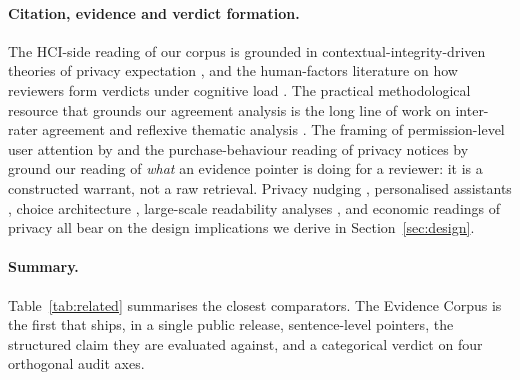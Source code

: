 \documentclass[11pt,a4paper]{article}
\begin{document}
\paragraph{Citation, evidence and verdict formation.}
The HCI-side reading of our corpus is grounded in
contextual-integrity-driven theories of privacy expectation
\citep{nissenbaum2004privacy,rao2016expecting}, and the human-factors
literature on how reviewers form verdicts under cognitive load
\citep{hart2008measurement,acquisti2015privacy}. The practical
methodological resource that grounds our agreement analysis is
the long line of work on inter-rater agreement
\citep{cohen1960coefficient,landis1977measurement} and reflexive
thematic analysis \citep{braun2006using}. The framing of
permission-level user attention by \citet{felt2012android} and the
purchase-behaviour reading of privacy notices by
\citet{tsai2011effect,jensen2004privacy} ground our reading of
\emph{what} an evidence pointer is doing for a reviewer: it is a
constructed warrant, not a raw retrieval. Privacy nudging
\citep{almuhimedi2015your}, personalised assistants
\citep{liu2016follow,lin2014modeling}, choice architecture
\citep{egelman2013choice}, large-scale readability analyses
\citep{fabian2017large,mcdonald2008cost}, and economic readings of
privacy \citep{acquisti2015privacy} all bear on the design
implications we derive in Section~\ref{sec:design}.

\paragraph{Summary.} Table~\ref{tab:related} summarises the closest
comparators. The Evidence Corpus is the first that ships, in a single
public release, sentence-level pointers, the structured claim they are
evaluated against, and a categorical verdict on four orthogonal
audit axes.
\end{document}
